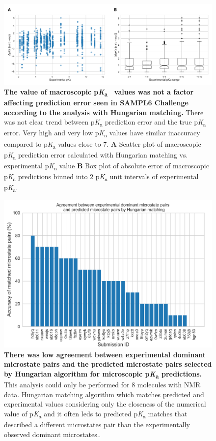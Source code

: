 \documentclass[9pt,lineno,final]{elife}
\newcommand{\pKa}{p\textit{K}\textsubscript{a}}
\begin{document}
\begin{figure}
\centering
\includegraphics[width=1.0\linewidth]{figures/typeIII_error_vs_exp_pKa.pdf}
\caption{ {\bf The value of macroscopic \pKa{}~ values was not a factor affecting prediction error seen in SAMPL6 Challenge according to the analysis with Hungarian matching.} There was not clear trend between \pKa{} prediction error and the true \pKa{} error. Very high and very low \pKa{} values have similar inaccuracy compared to \pKa{} values close to 7. {\bf A} Scatter plot of macroscopic \pKa{} prediction error calculated with Hungarian matching vs. experimental \pKa{} value {\bf B} Box plot of absolute error of macroscopic \pKa{} predictions binned into 2 \pKa{} unit intervals of experimental \pKa{}.
}
\label{fig:macroscopic-pKa-error-vs-pKa-value}
\end{figure}


\begin{figure}
\centering
\includegraphics[width=0.75\linewidth]{figures/TypeI_Hungarian_match_microstate_pair_accuracy.pdf}
\caption{ {\bf There was low agreement between experimental dominant microstate pairs and the predicted microstate pairs selected by Hungarian algorithm for microscopic \pKa{} predictions.} This analysis could only be performed for 8 molecules with NMR data. Hungarian matching algorithm which matches predicted and experimental values considering only the closeness of the numerical value of \pKa{} and it often leds to predicted \pKa{} matches that described a different microstates pair than the experimentally observed dominant microstates..
}
\label{fig:microstate-pairs-with-Hungarian-match-vs-experiments}
\end{figure}
\end{document}
